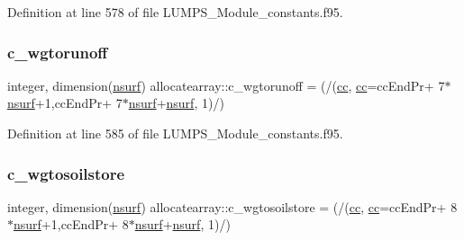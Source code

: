 Definition at line 578 of file L\+U\+M\+P\+S\+\_\+\+Module\+\_\+constants.\+f95.

\mbox{\label{namespaceallocatearray_a2288eb0b49a484223ef14c79fd697a6a}} 
\subsubsection{\texorpdfstring{c\+\_\+wgtorunoff}{c\_wgtorunoff}}
{\footnotesize\ttfamily integer, dimension(\hyperlink{namespaceallocatearray_acd22f92a06f7e9a2a91426b3dc99fdb0}{nsurf}) allocatearray\+::c\+\_\+wgtorunoff = (/(\hyperlink{namespaceallocatearray_ac863c81704eb507dee10f5e10741e10c}{cc}, \hyperlink{namespaceallocatearray_ac863c81704eb507dee10f5e10741e10c}{cc}=cc\+End\+Pr+ 7$\ast$\hyperlink{namespaceallocatearray_acd22f92a06f7e9a2a91426b3dc99fdb0}{nsurf}+1,cc\+End\+Pr+ 7$\ast$\hyperlink{namespaceallocatearray_acd22f92a06f7e9a2a91426b3dc99fdb0}{nsurf}+\hyperlink{namespaceallocatearray_acd22f92a06f7e9a2a91426b3dc99fdb0}{nsurf}, 1)/)}



Definition at line 585 of file L\+U\+M\+P\+S\+\_\+\+Module\+\_\+constants.\+f95.

\mbox{\label{namespaceallocatearray_a758dfb9cf7decebcf5cebad33671966a}} 
\subsubsection{\texorpdfstring{c\+\_\+wgtosoilstore}{c\_wgtosoilstore}}
{\footnotesize\ttfamily integer, dimension(\hyperlink{namespaceallocatearray_acd22f92a06f7e9a2a91426b3dc99fdb0}{nsurf}) allocatearray\+::c\+\_\+wgtosoilstore = (/(\hyperlink{namespaceallocatearray_ac863c81704eb507dee10f5e10741e10c}{cc}, \hyperlink{namespaceallocatearray_ac863c81704eb507dee10f5e10741e10c}{cc}=cc\+End\+Pr+ 8$\ast$\hyperlink{namespaceallocatearray_acd22f92a06f7e9a2a91426b3dc99fdb0}{nsurf}+1,cc\+End\+Pr+ 8$\ast$\hyperlink{namespaceallocatearray_acd22f92a06f7e9a2a91426b3dc99fdb0}{nsurf}+\hyperlink{namespaceallocatearray_acd22f92a06f7e9a2a91426b3dc99fdb0}{nsurf}, 1)/)}



